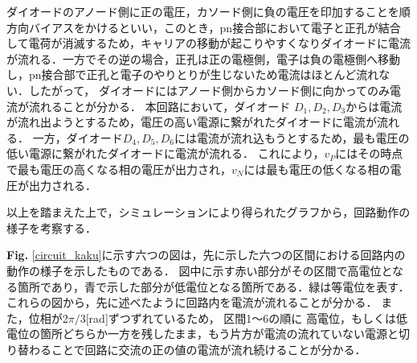 \documentclass[a4paper,12pt]{jarticle}
\begin{document}
ダイオードのアノード側に正の電圧，カソード側に負の電圧を印加することを順方向バイアスをかけるといい，このとき，pn接合部において電子と正孔が結合して電荷が消滅するため，キャリアの移動が起こりやすくなりダイオードに電流が流れる．一方でその逆の場合，正孔は正の電極側，電子は負の電極側へ移動し，pn接合部で正孔と電子のやりとりが生じないため電流はほとんど流れない．したがって，
ダイオードにはアノード側からカソード側に向かってのみ電流が流れることが分かる．
本回路において，ダイオード
$D_1,D_2,D_3$からは電流が流れ出ようとするため，電圧の高い電源に繋がれたダイオードに電流が流れる．
一方，ダイオード$D_4,D_5,D_6$には電流が流れ込もうとするため，最も電圧の低い電源に繋がれたダイオードに電流が流れる．
これにより，$v_P$にはその時点で最も電圧の高くなる相の電圧が出力され，$v_N$には最も電圧の低くなる相の電圧が出力される．

以上を踏まえた上で，シミュレーションにより得られたグラフから，回路動作の様子を考察する．

{\bf Fig. }\ref{circuit_kaku}に示す六つの図は，先に示した六つの区間における回路内の動作の様子を示したものである．
図中に示す赤い部分がその区間で高電位となる箇所であり，青で示した部分が低電位となる箇所である．緑は等電位を表す．これらの図から，先に述べたように回路内を電流が流れることが分かる．
また，位相が2$\pi/3$[rad]ずつずれているため，
区間1〜6の順に
高電位，もしくは低電位の箇所どちらか一方を残したまま，もう片方が電流の流れていない電源と切り替わることで回路に交流の正の値の電流が流れ続けることが分かる．






\end{document}
